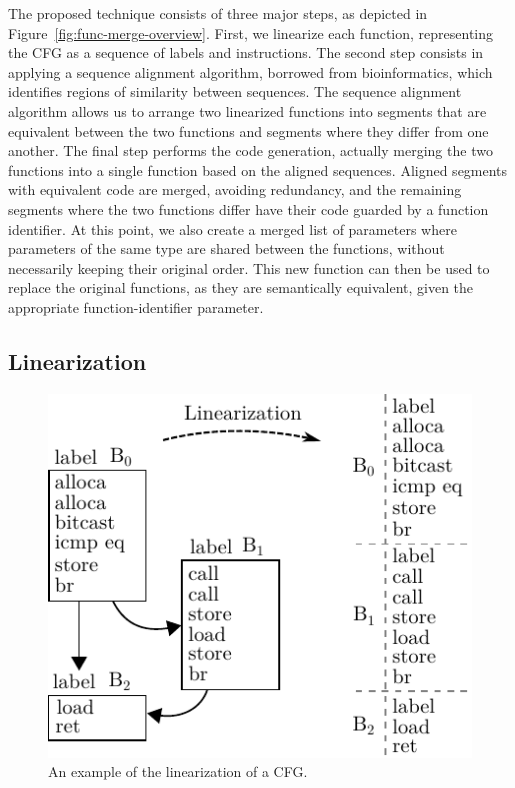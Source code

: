 The proposed technique consists of three major steps, as depicted in
Figure~\ref{fig:func-merge-overview}.
First, we linearize each function, representing the CFG as a sequence of
labels and instructions.
The second step consists in applying a sequence alignment algorithm, borrowed
from bioinformatics, which identifies regions of similarity between sequences.
The sequence alignment algorithm allows us to arrange two linearized functions
into segments that are equivalent between the two functions and segments where
they differ from one another.
The final step performs the code generation, actually merging the two functions
into a single function based on the aligned sequences.
Aligned segments with equivalent code are merged, avoiding redundancy, %
and the remaining segments where the two functions differ have their code guarded by a function identifier. At this point, we also create a
merged list of parameters where parameters of the same type are shared between the functions, without necessarily keeping their original
order. This new function can then be used to replace the original functions, as they are semantically equivalent, given the appropriate
function-identifier parameter.

\subsection{Linearization}

\begin{figure}[b]
  \centering
  \includegraphics[width=0.7\linewidth]{figs/linearization-example.pdf}
  \caption{An example of the linearization of a CFG.}
  \label{fig:linearization-example}
\end{figure}

